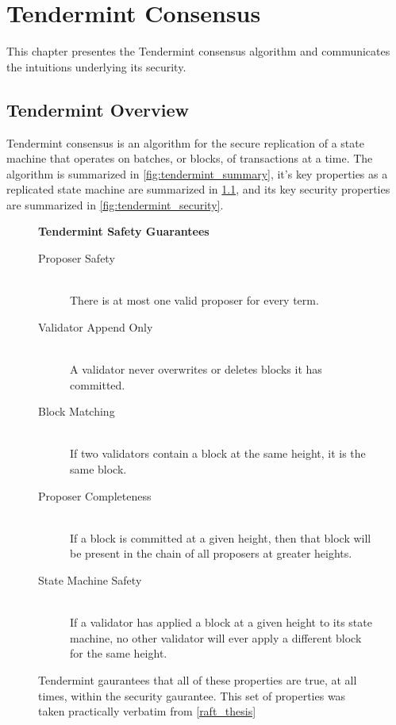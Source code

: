\chapter{Tendermint Consensus}
\label{ch:tendermint}

This chapter presentes the Tendermint consensus algorithm and communicates the intuitions underlying its security.

\section{Tendermint Overview}

Tendermint consensus is an algorithm for the secure replication of a state machine that operates on batches, or blocks, of transactions at a time.
The algorithm is summarized in \ref{fig:tendermint_summary}, it's key properties as a replicated state machine are summarized in \ref{fig:tendermint_gaurantees}, and its key security properties are summarized in \ref{fig:tendermint_security}.

\begin{figure}[]
	\textbf{Tendermint Safety Guarantees}
	\begin{description}
	  \item[Proposer Safety] \hfill \\
		There is at most one valid proposer for every term.
	  \item[Validator Append Only] \hfill \\
		A validator never overwrites or deletes blocks it has committed.
	  \item[Block Matching] \hfill \\
		If two validators contain a block at the same height, it is the same block.
	  \item[Proposer Completeness] \hfill \\
		If a block is committed at a given height, then that block will be present in the chain of all proposers at greater heights.
	  \item[State Machine Safety] \hfill \\
		If a validator has applied a block at a given height to its state machine, no other validator will ever apply a different block for the same height.
	\end{description}
	\label{fig:tendermint_gaurantees}
  \caption{Tendermint gaurantees that all of these properties are true, at all times, within the security gaurantee. This set of properties was taken practically verbatim from \ref{raft_thesis}}
\end{figure}

